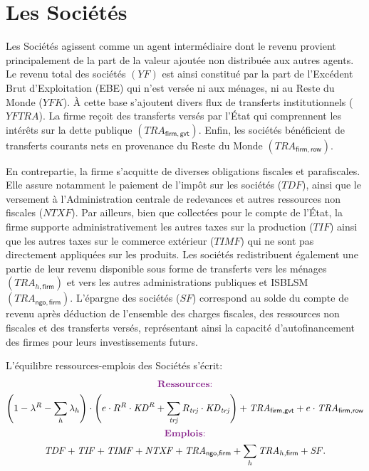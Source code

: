 \documentclass[11pt,a4paper]{article}
\newcommand{\trj}{\mathit{trj}}
\newcommand{\gvt}{\mathsf{gvt}}
\newcommand{\firm}{\mathsf{firm}}
\newcommand{\ngo}{\mathsf{ngo}}
\newcommand{\row}{\mathsf{row}}
\newcommand{\YFTR}{\mathit{YFTRA}}
\newcommand{\KD}{\mathit{KD}}
\newcommand{\SF}{\mathit{SF}}
\newcommand{\TIF}{\mathit{TIF}}
\newcommand{\TIMF}{\mathit{TIMF}}
\newcommand{\TRA}{\mathit{TRA}}
\newcommand{\TR}{\mathit{TRA}}
\newcommand{\NTXF}{\mathit{NTXF}}
\newcommand{\TDF}{\mathit{TDF}}
\newcommand{\YF}{\mathit{YF}}
\newcommand{\YFK}{\mathit{YFK}}
\begin{document}
	\section{Les Sociétés}
	Les Sociétés agissent comme un agent intermédiaire dont le revenu provient principalement de la part de la valeur ajoutée non distribuée aux autres agents. Le revenu total des sociétés $\left(\YF\right)$ est ainsi constitué par la part de l'Excédent Brut d'Exploitation (EBE) qui n'est versée ni aux ménages, ni au Reste du Monde ($\YFK$). À cette base s'ajoutent divers flux de transferts institutionnels ($\YFTR$). La firme reçoit des transferts versés par l'État qui comprennent les intérêts sur la dette publique $\left(\TR_{\firm,\gvt}\right)$. Enfin, les sociétés bénéficient de transferts courants nets en provenance du Reste du Monde $\left(\TR_{\firm,\row}\right)$.
	
	En contrepartie, la firme s'acquitte de diverses obligations fiscales et parafiscales. Elle assure notamment le paiement de l'impôt sur les sociétés ($\TDF$), ainsi que le versement à l'Administration centrale de redevances et autres ressources non fiscales ($\NTXF$). Par ailleurs, bien que collectées pour le compte de l'État, la firme supporte administrativement les autres taxes sur la production ($\TIF$) ainsi que les autres taxes sur le commerce extérieur ($\TIMF$) qui ne sont pas directement appliquées sur les produits. Les sociétés redistribuent également une partie de leur revenu disponible sous forme de transferts vers les ménages $\left(\TRA_{h,\firm}\right)$ et vers les autres administrations publiques et ISBLSM $\left(\TRA_{\ngo,\firm}\right)$. L'épargne des sociétés ($\SF$) correspond au solde du compte de revenu après déduction de l'ensemble des charges fiscales, des ressources non fiscales et des transferts versés, représentant ainsi la capacité d'autofinancement des firmes pour leurs investissements futurs.
	
	L'équilibre ressources-emplois des Sociétés s'écrit:
	\begin{gather}
		\centerline{\textcolor{Fuchsia}{\textbf{Ressources}:}} \notag\\
		\left(1 - \lambda^R-\sum_{h}\lambda_h\right)\cdot\left(e\cdot R^R\cdot\KD^R + \sum_{\trj}^{} R_{\trj}\cdot\KD_{\trj}\right)+ \TR_{\firm,\gvt} + e\cdot\TRA_{\firm,\row} \notag\\
		\centerline{\textcolor{Fuchsia}{\textbf{Emplois}:}} \notag\\
		\TDF + \TIF + \TIMF + \NTXF + \TRA_{\ngo,\firm} + \sum_{h} \TRA_{h,\firm} + \SF.\notag
	\end{gather}
	
\end{document}
